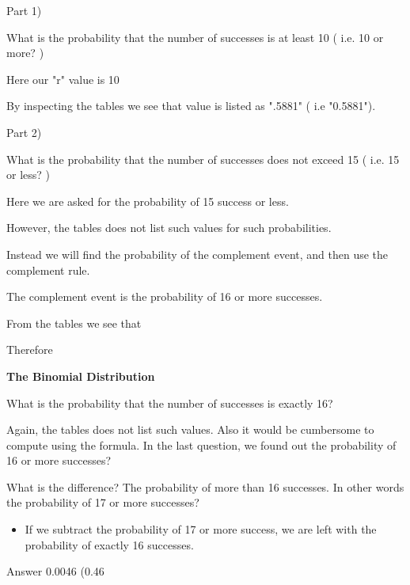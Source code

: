 \documentclass[]{report}
\begin{document}
Part 1)

What is the probability that the number of successes is at least 10  ( i.e. 10 or more? ) 



Here our "r" value is 10

By inspecting the tables we see that value is listed as ".5881" 
( i.e "0.5881").

Part 2) 

What is the probability that the number of successes does not exceed 15  ( i.e. 15 or less? )



Here we are asked for the probability of 15 success or less.


However, the tables does not list such values for such probabilities.

Instead we will find the probability of the complement event, and then use the complement rule.

The complement event is the probability of 16 or more successes.


From the tables we see that  

Therefore  



\textbf{The Binomial Distribution}




What is the probability that the number of successes is exactly 16?


Again, the tables does not list such values. Also it would be cumbersome to compute using the formula.
In the last question, we found out the probability of 16 or more successes?

What is the difference? The probability of more than 16 successes.
In other words the probability of  17 or more successes?


\begin{itemize}
\item If we subtract the probability of 17 or more success, we are left with the probability of exactly 16 successes.
\end{itemize}

Answer 0.0046        (0.46%




\end{document}
